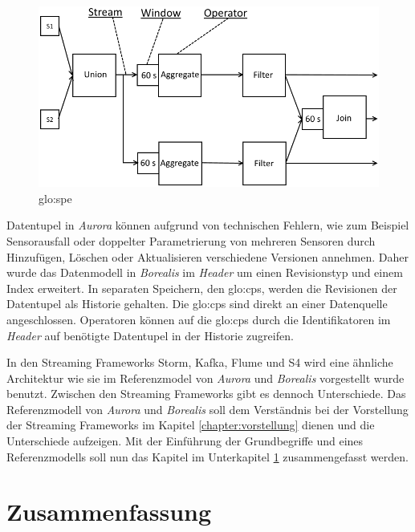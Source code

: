 \begin{figure}[htb!]
\centering
\includegraphics[width=1.0\textwidth]{bilder/QueryDiagram.png}
\caption{\acrlong{glo:spe}\label{fig:querydiagramspe}}
\end{figure}

Datentupel in \textit{Aurora} können aufgrund von technischen Fehlern, wie zum Beispiel Sensorausfall oder doppelter Parametrierung von mehreren Sensoren durch Hinzufügen, Löschen oder Aktualisieren verschiedene Versionen annehmen. Daher wurde das Datenmodell in \textit{Borealis} im \textit{Header} um einen Revisionstyp und einem Index erweitert. In separaten Speichern, den \glspl{glo:cp}, werden die Revisionen der Datentupel als Historie gehalten. Die \glspl{glo:cp} sind direkt an einer Datenquelle angeschlossen. Operatoren können auf die \glspl{glo:cp} durch die Identifikatoren im \textit{Header} auf benötigte Datentupel in der Historie zugreifen. 

In den Streaming Frameworks Storm, Kafka, Flume und S4 wird eine ähnliche Architektur wie sie im Referenzmodel von \textit{Aurora} und \textit{Borealis} vorgestellt wurde benutzt. Zwischen den Streaming Frameworks gibt es dennoch Unterschiede. Das Referenzmodell von \textit{Aurora} und \textit{Borealis} soll dem Verständnis bei der Vorstellung der Streaming Frameworks im Kapitel \ref{chapter:vorstellung} dienen und die Unterschiede aufzeigen. Mit der Einführung der Grundbegriffe und eines Referenzmodells soll nun das Kapitel  im Unterkapitel \ref{section:zusammenfassung} zusammengefasst werden.

\section{Zusammenfassung}
\label{section:zusammenfassung}

